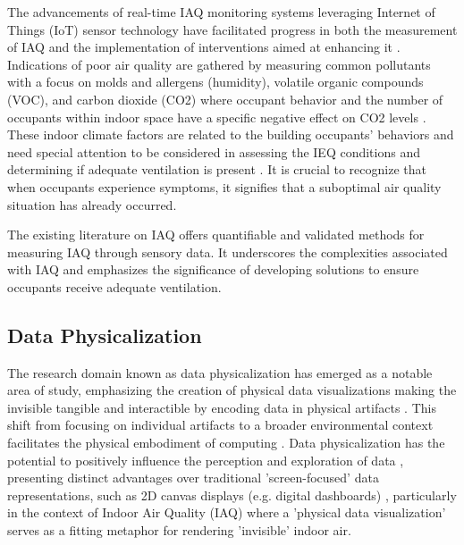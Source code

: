 The advancements of real-time IAQ monitoring systems leveraging Internet of Things (IoT) sensor technology have facilitated progress in both the measurement of IAQ and the implementation of interventions aimed at enhancing it \cite{pantelic_transformational_2022}. Indications of poor air quality are gathered by measuring common pollutants with a focus on molds and allergens (humidity), volatile organic compounds (VOC), and carbon dioxide (CO2) \cite{klepeis_national_2001} where occupant behavior and the number of occupants within indoor space have a specific negative effect on CO2 levels \cite{fromme_indoor_2023}. These indoor climate factors are related to the building occupants’ behaviors and need special attention to be considered in assessing the IEQ conditions and determining if adequate ventilation is present \cite{du_indoor_2020}. It is crucial to recognize that when occupants experience symptoms, it signifies that a suboptimal air quality situation has already occurred.

The existing literature on IAQ offers quantifiable and validated methods for measuring IAQ through sensory data. It underscores the complexities associated with IAQ and emphasizes the significance of developing solutions to ensure occupants receive adequate ventilation.


\subsection{Data Physicalization}

The research domain known as data physicalization \cite{alexander_data_2019, jansen_opportunities_2015} has emerged as a notable area of study, emphasizing the creation of physical data visualizations making the invisible tangible and interactible by encoding data in physical artifacts \cite{ranasinghe_encoding_2023}. This shift from focusing on individual artifacts to a broader environmental context facilitates the physical embodiment of computing \cite{dragicevic_data_2020}. Data physicalization has the potential to positively influence the perception and exploration of data \cite{jansen_opportunities_2015, wang_emotional_2019, stusak_evaluating_2015}, presenting distinct advantages over traditional 'screen-focused' data representations, such as 2D canvas displays (e.g. digital dashboards) \cite{hornecker_design_2023, jansen_evaluating_2013}, particularly in the context of Indoor Air Quality (IAQ) where a 'physical data visualization' serves as a fitting metaphor for rendering 'invisible' indoor air.

